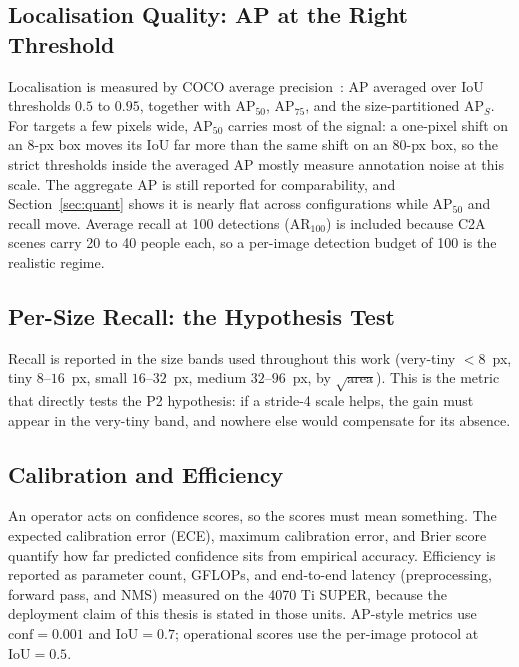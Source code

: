 \subsection{Localisation Quality: AP at the Right Threshold}
Localisation is measured by COCO average precision~\cite{lin2014coco}:
$\mathrm{AP}$ averaged
over IoU thresholds $0.5$ to $0.95$, together with $\mathrm{AP}_{50}$,
$\mathrm{AP}_{75}$, and the size-partitioned $\mathrm{AP}_S$. For targets a
few pixels wide, $\mathrm{AP}_{50}$ carries most of the signal: a one-pixel
shift on an 8-px box moves its IoU far more than the same shift on an 80-px
box, so the strict thresholds inside the averaged AP mostly measure
annotation noise at this scale. The aggregate AP is still reported for
comparability, and Section~\ref{sec:quant} shows it is nearly flat across
configurations while $\mathrm{AP}_{50}$ and recall move. Average recall at
100 detections ($\mathrm{AR}_{100}$) is included because C2A scenes carry 20
to 40 people each, so a per-image detection budget of 100 is the realistic
regime.

\subsection{Per-Size Recall: the Hypothesis Test}
Recall is reported in the size bands used throughout this work (very-tiny
$<8$~px, tiny $8$--$16$~px, small $16$--$32$~px, medium $32$--$96$~px, by
$\sqrt{\text{area}}$). This is the metric that directly tests the P2
hypothesis: if a stride-4 scale helps, the gain must appear in the very-tiny
band, and nowhere else would compensate for its absence.

\subsection{Calibration and Efficiency}
An operator acts on confidence scores, so the scores must mean something. The
expected calibration error (ECE), maximum calibration error, and Brier score
quantify how far predicted confidence sits from empirical accuracy.
Efficiency is reported as parameter count, GFLOPs, and end-to-end latency
(preprocessing, forward pass, and NMS) measured on the 4070 Ti SUPER, because
the deployment claim of this thesis is stated in those units. AP-style
metrics use $\text{conf} = 0.001$ and $\text{IoU} = 0.7$; operational scores
use the per-image protocol at $\text{IoU} = 0.5$.

